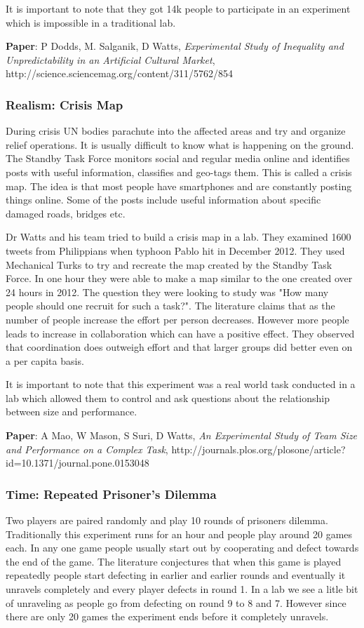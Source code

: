 It is important to note that they got 14k people to participate in an experiment which is impossible in a traditional lab.

\textbf{Paper}: P Dodds, M. Salganik, D Watts,
\textit{Experimental Study of Inequality and Unpredictability in an Artificial Cultural Market}, http://science.sciencemag.org/content/311/5762/854

\subsubsection{Realism: Crisis Map}
During crisis UN bodies parachute into the affected areas and try and organize relief operations. It is usually difficult to know what is happening on the ground. The Standby Task Force monitors social and regular media online and identifies posts with useful information, classifies and geo-tags them. This is called a crisis map. The idea is that most people have smartphones and are constantly posting things online. Some of the posts include useful information about specific damaged roads, bridges etc.

Dr Watts and his team tried to build a crisis map in a lab. They examined 1600 tweets from Philippians when typhoon Pablo hit in December 2012. They used Mechanical Turks to try and recreate the map created by the Standby Task Force. In one hour they were able to make a map similar to the one created over 24 hours in 2012. The question they were looking to study was "How many people should one recruit for such a task?". The literature claims that as the number of people increase the effort per person decreases. However more people leads to increase in collaboration which can have a positive effect. They observed that coordination does outweigh effort and that larger groups did better even on a per capita basis. 

It is important to note that this experiment was a real world task conducted in a lab which allowed them to control and ask questions about the relationship between size and performance. 

\textbf{Paper}: A Mao, W Mason, S Suri, D Watts,
\textit{An Experimental Study of Team Size and Performance on a Complex Task}, http://journals.plos.org/plosone/article?id=10.1371/journal.pone.0153048

\subsubsection{Time: Repeated Prisoner's Dilemma}
Two players are paired randomly and play 10 rounds of prisoners dilemma. Traditionally this experiment runs for an hour and people play around 20 games each. In any one game people usually start out by cooperating and defect towards the end of the game. The literature conjectures  that when this game is played repeatedly people start defecting in earlier and earlier rounds and eventually it unravels completely and every player defects in round 1. In a lab we see a litle bit of unraveling as people go from defecting on round 9 to 8 and 7. However since there are only 20 games the experiment ends before it completely unravels. 

